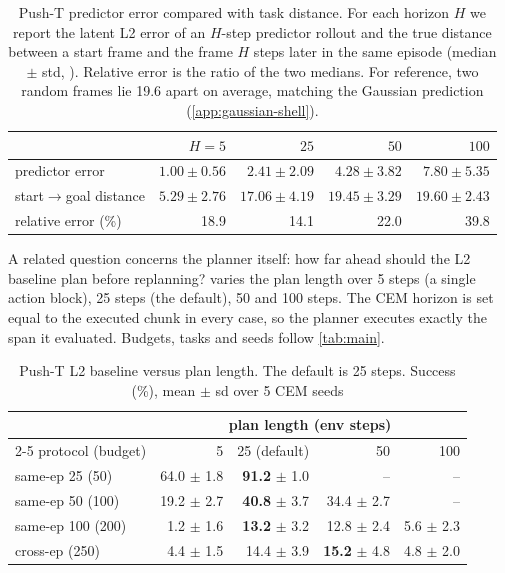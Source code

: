 \documentclass{article} %
\theoremstyle{definition}
\theoremstyle{remark}
\begin{document}
\begin{table}[h]
\centering\small
\caption{Push-T predictor error compared with task distance. For each horizon $H$ we report
the latent L2 error of an $H$-step predictor rollout and the true distance between a start frame
and the frame $H$ steps later in the same episode (median $\pm$ std, ). Relative error is the ratio of the two medians. For reference, two
random frames lie 19.6 apart on average, matching the Gaussian prediction
 (\cref{app:gaussian-shell}).}
\label{tab:predictor-error-and-task-distance}
\begin{tabular}{lrrrr}
\toprule
& $H=5$ & $25$ & $50$ & $100$ \\
\midrule
predictor error         & $1.00\pm0.56$ & $2.41\pm2.09$ & $4.28\pm3.82$ & $7.80\pm5.35$ \\
start$\to$goal distance & $5.29\pm2.76$ & $17.06\pm4.19$ & $19.45\pm3.29$ & $19.60\pm2.43$ \\
relative error (\%)     & 18.9 & 14.1 & 22.0 & 39.8 \\
\bottomrule
\end{tabular}
\end{table}


A related question concerns the planner itself: how far ahead should the L2 baseline plan
before replanning?  varies the plan length over 5 steps (a
single action block), 25 steps (the default), 50 and 100 steps. The CEM horizon is set equal to
the executed chunk in every case, so the planner executes exactly the span it evaluated. Budgets,
tasks and seeds follow \cref{tab:main}.

\begin{table}[h]
\centering\small
\caption{Push-T L2 baseline versus plan length. The default is 25 steps. Success (\%), mean $\pm$ sd over 5 CEM seeds}
\label{tab:replan-frequency-appendix}
\begin{tabular}{lrrrr}
\toprule
& \multicolumn{4}{c}{plan length (env steps)} \\
\cmidrule(lr){2-5}
protocol (budget) & 5 & 25 (default) & 50 & 100 \\
\midrule
same-ep 25 (50)   & 64.0 $\pm$ 1.8 & \textbf{91.2} $\pm$ 1.0 & -- & -- \\
same-ep 50 (100)  & 19.2 $\pm$ 2.7 & \textbf{40.8} $\pm$ 3.7 & 34.4 $\pm$ 2.7 & -- \\
same-ep 100 (200) & 1.2 $\pm$ 1.6  & \textbf{13.2} $\pm$ 3.2 & 12.8 $\pm$ 2.4 & 5.6 $\pm$ 2.3 \\
cross-ep (250)    & 4.4 $\pm$ 1.5  & 14.4 $\pm$ 3.9 & \textbf{15.2} $\pm$ 4.8 & 4.8 $\pm$ 2.0 \\
\bottomrule
\end{tabular}
\end{table}
\end{document}
